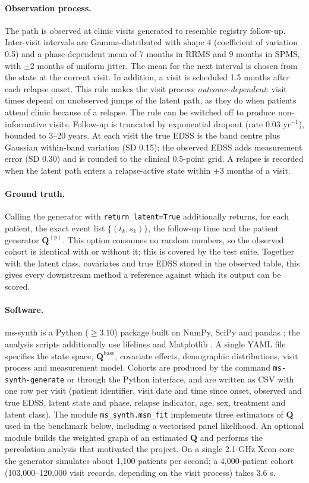 \documentclass[11pt,a4paper]{article}
\newcommand{\Q}{\mathbf{Q}}
\newcommand{\soft}[1]{\texttt{#1}}
\begin{document}
\paragraph{Observation process.}
The path is observed at clinic visits generated to resemble registry follow-up. Inter-visit intervals are Gamma-distributed with shape 4 (coefficient of variation 0.5) and a phase-dependent mean of 7 months in RRMS and 9 months in SPMS, with $\pm 2$ months of uniform jitter. The mean for the next interval is chosen from the state at the current visit. In addition, a visit is scheduled 1.5 months after each relapse onset. This rule makes the visit process \emph{outcome-dependent}: visit times depend on unobserved jumps of the latent path, as they do when patients attend clinic because of a relapse. The rule can be switched off to produce non-informative visits. Follow-up is truncated by exponential dropout (rate 0.03 yr$^{-1}$), bounded to 3--20 years. At each visit the true EDSS is the band centre plus Gaussian within-band variation (SD 0.15); the observed EDSS adds measurement error (SD 0.30) and is rounded to the clinical 0.5-point grid. A relapse is recorded when the latent path enters a relapse-active state within $\pm 3$ months of a visit.

\paragraph{Ground truth.}
Calling the generator with \soft{return\_latent=True} additionally returns, for each patient, the exact event list $\{(t_k,s_k)\}$, the follow-up time and the patient generator $\Q^{(p)}$. This option consumes no random numbers, so the observed cohort is identical with or without it; this is covered by the test suite. Together with the latent class, covariates and true EDSS stored in the observed table, this gives every downstream method a reference against which its output can be scored.

\paragraph{Software.}
ms-synth is a Python ($\geq$3.10) package built on NumPy, SciPy and pandas \cite{harris2020,virtanen2020,mckinney2010}; the analysis scripts additionally use lifelines and Matplotlib \cite{davidsonpilon2019,hunter2007}. A single YAML file specifies the state space, $\Q^{\mathrm{base}}$, covariate effects, demographic distributions, visit process and measurement model. Cohorts are produced by the command \soft{ms-synth-generate} or through the Python interface, and are written as CSV with one row per visit (patient identifier, visit date and time since onset, observed and true EDSS, latent state and phase, relapse indicator, age, sex, treatment and latent class). The module \soft{ms\_synth.msm\_fit} implements three estimators of $\Q$ used in the benchmark below, including a vectorised panel likelihood. An optional module builds the weighted graph of an estimated $\Q$ and performs the percolation analysis that motivated the project. On a single 2.1-GHz Xeon core the generator simulates about 1,100 patients per second; a 4,000-patient cohort (103,000--120,000 visit records, depending on the visit process) takes 3.6 s.
\end{document}
